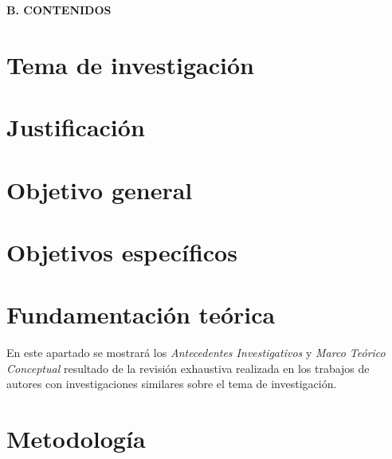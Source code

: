 \documentclass{perfil}
\begin{document}


\renewcommand{\thepage}{\arabic{page}}%
\begin{center} \textbf{B. CONTENIDOS} \end{center}
\section{Tema de investigación}



\section{Justificación}


\section{Objetivo general}


\section{Objetivos específicos}


\section{Fundamentación teórica}
En este apartado se mostrará los \textit{Antecedentes Investigativos} y \textit{Marco Teórico Conceptual}
resultado de la revisión exhaustiva realizada en los trabajos de autores con investigaciones similares
sobre el tema de investigación.



\section{Metodología}






\end{document}
